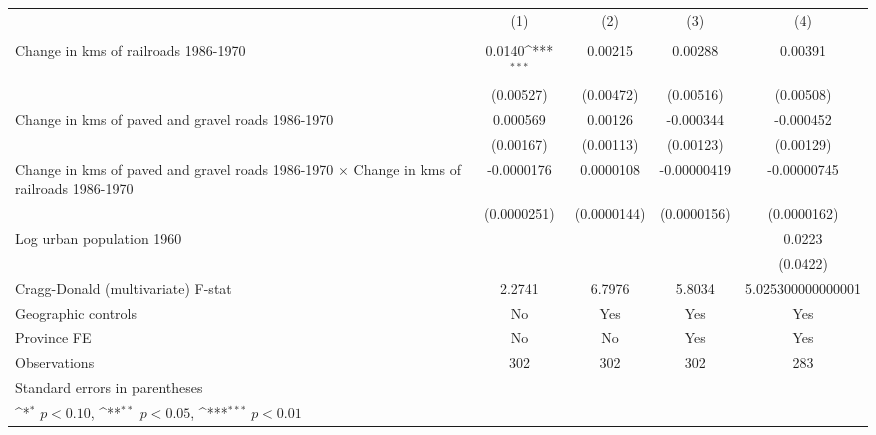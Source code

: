{
\def\sym#1{\ifmmode^{#1}\else\(^{#1}\)\fi}
\begin{tabular}{l*{4}{c}}
\hline\hline
                &\multicolumn{1}{c}{(1)}&\multicolumn{1}{c}{(2)}&\multicolumn{1}{c}{(3)}&\multicolumn{1}{c}{(4)}\\
                &\multicolumn{1}{c}{}&\multicolumn{1}{c}{}&\multicolumn{1}{c}{}&\multicolumn{1}{c}{}\\
\hline
Change in kms of railroads 1986-1970&   0.0140\sym{***}&  0.00215         &  0.00288         &  0.00391         \\
                &(0.00527)         &(0.00472)         &(0.00516)         &(0.00508)         \\
[1em]
Change in kms of paved and gravel roads 1986-1970& 0.000569         &  0.00126         &-0.000344         &-0.000452         \\
                &(0.00167)         &(0.00113)         &(0.00123)         &(0.00129)         \\
[1em]
Change in kms of paved and gravel roads 1986-1970 $\times$ Change in kms of railroads 1986-1970&-0.0000176         &0.0000108         &-0.00000419         &-0.00000745         \\
                &(0.0000251)         &(0.0000144)         &(0.0000156)         &(0.0000162)         \\
[1em]
Log urban population 1960&                  &                  &                  &   0.0223         \\
                &                  &                  &                  & (0.0422)         \\
\hline
Cragg-Donald (multivariate) F-stat&   2.2741         &   6.7976         &   5.8034         &5.025300000000001         \\
Geographic controls&       No         &      Yes         &      Yes         &      Yes         \\
Province FE     &       No         &       No         &      Yes         &      Yes         \\
Observations    &      302         &      302         &      302         &      283         \\
\hline\hline
\multicolumn{5}{l}{\footnotesize Standard errors in parentheses}\\
\multicolumn{5}{l}{\footnotesize \sym{*} \(p<0.10\), \sym{**} \(p<0.05\), \sym{***} \(p<0.01\)}\\
\end{tabular}
}
